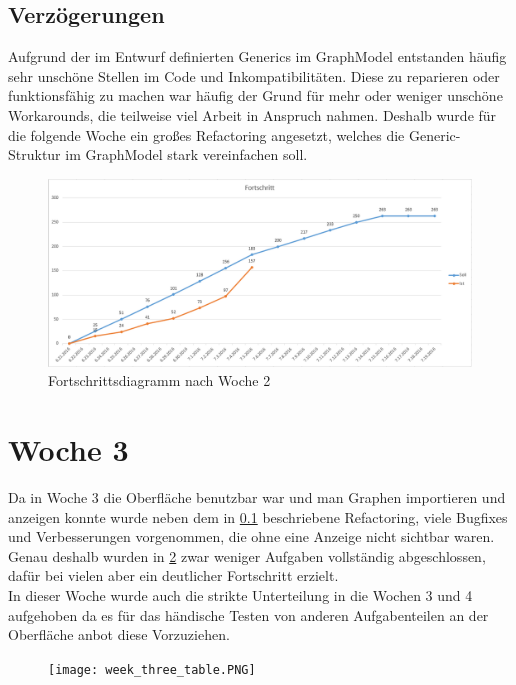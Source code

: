 \subsection{Verzögerungen}
\label{sec:delay_week2}
Aufgrund der im Entwurf definierten Generics im GraphModel entstanden häufig sehr unschöne Stellen im Code und Inkompatibilitäten. Diese zu reparieren oder funktionsfähig zu machen war häufig der Grund für mehr oder weniger unschöne Workarounds, die teilweise viel Arbeit in Anspruch nahmen. Deshalb wurde für die folgende Woche ein großes Refactoring angesetzt, welches die Generic-Struktur im GraphModel stark vereinfachen soll.
\begin{figure}[!htbp]
	\centering
	\includegraphics[width=380pt]{resourcen/week_two_diagram.PNG}
	\caption{Fortschrittsdiagramm nach Woche 2}
	\label{fig:week_two_diagram}
\end{figure}

\newpage

\section{Woche 3}
Da in Woche 3 die Oberfläche benutzbar war und man Graphen importieren und anzeigen konnte wurde neben dem in \ref{sec:delay_week2} beschriebene Refactoring, viele Bugfixes und Verbesserungen vorgenommen, die ohne eine Anzeige nicht sichtbar waren. Genau deshalb wurden in \ref{fig:week_three_table} zwar weniger Aufgaben vollständig abgeschlossen, dafür bei vielen aber ein deutlicher Fortschritt erzielt. \\
In dieser Woche wurde auch die strikte Unterteilung in die Wochen 3 und 4 aufgehoben da es für das händische Testen von anderen Aufgabenteilen an der Oberfläche anbot diese Vorzuziehen.
\begin{figure}[!htbp]
	\centering
	\texttt{[image: week\_three\_table.PNG]}
	\caption{}
	\label{fig:week_three_table}
\end{figure}
